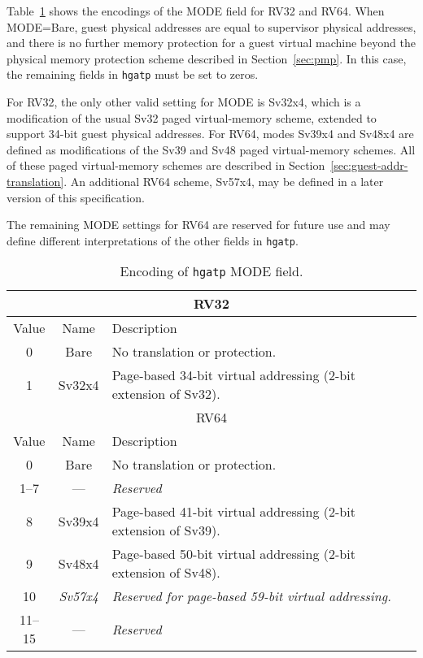 Table~\ref{tab:hgatp-mode} shows the encodings of the MODE field for RV32 and
RV64.
When MODE=Bare, guest physical addresses are equal to supervisor physical
addresses, and there is no further memory protection for a guest virtual
machine beyond the physical memory protection scheme described in
Section~\ref{sec:pmp}.
In this case, the remaining fields in {\tt hgatp} must be set to zeros.

For RV32, the only other valid setting for MODE is Sv32x4, which is a
modification of the usual Sv32 paged virtual-memory scheme, extended to support
34-bit guest physical addresses.
For RV64, modes Sv39x4 and Sv48x4 are defined as modifications of the Sv39 and
Sv48 paged virtual-memory schemes.
All of these paged virtual-memory schemes are described in
Section~\ref{sec:guest-addr-translation}.
An additional RV64 scheme, Sv57x4, may be defined in a later version of this
specification.

The remaining MODE settings for RV64 are reserved for future use and may define
different interpretations of the other fields in {\tt hgatp}.

\begin{table}[h]
\begin{center}
\begin{tabular}{|c|c|l|}
\hline
\multicolumn{3}{|c|}{RV32} \\
\hline
Value  & Name & Description \\
\hline
0      & Bare   & No translation or protection. \\
1      & Sv32x4 & Page-based 34-bit virtual addressing (2-bit extension of Sv32). \\
\hline \hline
\multicolumn{3}{|c|}{RV64} \\
\hline
Value  & Name & Description \\
\hline
0      & Bare   & No translation or protection. \\
1--7   & ---    & {\em Reserved} \\
8      & Sv39x4 & Page-based 41-bit virtual addressing (2-bit extension of Sv39). \\
9      & Sv48x4 & Page-based 50-bit virtual addressing (2-bit extension of Sv48). \\
10     & {\em Sv57x4} & {\em Reserved for page-based 59-bit virtual addressing.} \\
11--15 & ---    & {\em Reserved} \\
\hline
\end{tabular}
\end{center}
\caption{Encoding of {\tt hgatp} MODE field.}
\label{tab:hgatp-mode}
\end{table}

